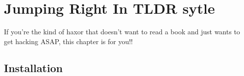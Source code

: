 \chapter{Jumping Right In TLDR sytle}
If you're the kind of haxor that doesn't want to read a book and just wants to get hacking ASAP, this chapter is for you!!

\section{Installation}
